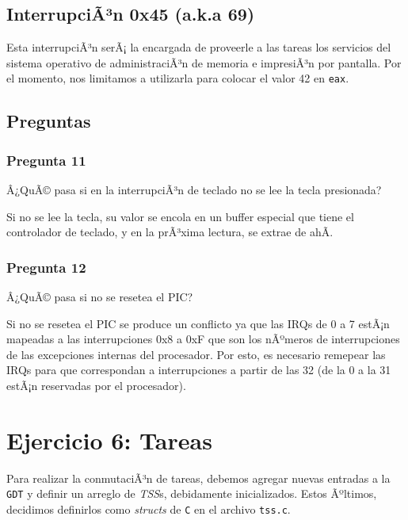 \documentclass[10pt, a4paper]{article}
\begin{document}
\subsection{InterrupciÃ³n 0x45 (a.k.a 69)}
Esta interrupciÃ³n serÃ¡ la encargada de proveerle a las tareas los servicios del sistema operativo de administraciÃ³n de memoria e impresiÃ³n por pantalla. Por el momento, nos limitamos a utilizarla para colocar el valor 42 en \texttt{eax}.

\subsection{Preguntas}
\subsubsection*{Pregunta 11}
 \begin{framed}
Â¿QuÃ© pasa si en la interrupciÃ³n de teclado no se lee la tecla presionada?
\end{framed}
Si no se lee la tecla, su valor se encola en un buffer especial que tiene el controlador de teclado, y en la prÃ³xima lectura, se extrae de ahÃ­.

\subsubsection*{Pregunta 12}
 \begin{framed}
Â¿QuÃ© pasa si no se resetea el PIC?
\end{framed}
Si no se resetea el PIC se produce un conflicto ya que las IRQs de 0 a 7 estÃ¡n mapeadas a las interrupciones 0x8 a 0xF que son los nÃºmeros de interrupciones
de las excepciones internas del procesador. Por esto, es necesario remepear las IRQs para que correspondan a interrupciones a partir de las 32 (de la 0 a la 31
estÃ¡n reservadas por el procesador).

\newpage

\section{Ejercicio 6: Tareas}
Para realizar la conmutaciÃ³n de tareas, debemos agregar nuevas entradas a la \texttt{GDT} y definir un arreglo de \emph{TSS}s, debidamente inicializados. 
Estos Ãºltimos, decidimos definirlos como \emph{structs} de \texttt{C} en el archivo \texttt{tss.c}.
\end{document}

